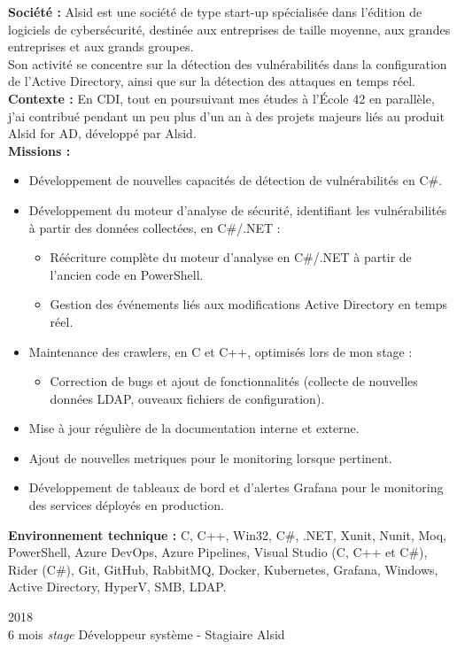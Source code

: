 \documentclass[8pt]{developercv} %
\begin{document}
\textbf{Société :} Alsid est une société de type start-up spécialisée dans l'édition de logiciels de cybersécurité, destinée aux entreprises de taille moyenne, aux grandes entreprises et aux grands groupes.\\
Son activité se concentre sur la détection des vulnérabilités dans la configuration de l'Active Directory, ainsi que sur la détection des attaques en temps réel.\\

\textbf{Contexte :} En CDI, tout en poursuivant mes études à l'École 42 en parallèle, j'ai contribué pendant un peu plus d'un an à des projets majeurs liés au produit Alsid for AD, développé par Alsid.\\

\textbf{Missions :}
\begin{itemize}
    \item Développement de nouvelles capacités de détection de vulnérabilités en C\#.
    \item Développement du moteur d'analyse de sécurité, identifiant les vulnérabilités à partir des données collectées, en C\#/.NET :
        \begin{itemize}
            \item Réécriture complète du moteur d'analyse en C\#/.NET à partir de l'ancien code en PowerShell.
            \item Gestion des événements liés aux modifications Active Directory en temps réel.
        \end{itemize}
    \item Maintenance des crawlers, en C et C++, optimisés lors de mon stage :
        \begin{itemize}
            \item Correction de bugs et ajout de fonctionnalités (collecte de nouvelles données LDAP, ouveaux fichiers de configuration).
        \end{itemize}
    \item Mise à jour régulière de la documentation interne et externe.
    \item Ajout de nouvelles metriques pour le monitoring lorsque pertinent.
    \item Développement de tableaux de bord et d'alertes Grafana pour le monitoring des services déployés en production.
\end{itemize}
\vspace{\baselineskip}
\textbf{Environnement technique :} C, C++, Win32, C\#, .NET, Xunit, Nunit, Moq, PowerShell, Azure DevOps, Azure Pipelines, Visual Studio (C, C++ et C\#), Rider (C\#), Git, GitHub, RabbitMQ, Docker, Kubernetes, Grafana, Windows, Active Directory, HyperV, SMB, LDAP.\\
\vspace{\baselineskip}
\begin{entrylisthrules}
    \entry
    {2018\\\footnotesize{6 mois \emph{stage}}}
    {Développeur système  - Stagiaire}
    {Alsid}
    {}
\end{entrylisthrules}
\end{document}
